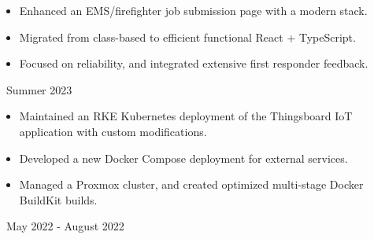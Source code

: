 \documentclass[11pt,letterpaper,ragged2e]{altacv}
\begin{document}

\hfuzz=5pt %

\begin{fullwidth}
	\makecvheader
\end{fullwidth}




{
	\begin{itemize}
		\item Enhanced an EMS/firefighter job submission page with a modern stack.
		\item Migrated from class-based to efficient functional React + TypeScript.
		\item Focused on reliability, and integrated extensive first responder feedback.
	\end{itemize}
}
{\faCalendar\, Summer 2023}
{
}


{
	\begin{itemize}
		\item Maintained an RKE Kubernetes deployment of the Thingsboard IoT application with custom modifications.
		\item Developed a new Docker Compose deployment for external services.
		\item Managed a Proxmox cluster, and created optimized multi-stage Docker BuildKit builds.
	\end{itemize}
}
{\faCalendar\, May 2022 - August 2022}
{
}
\end{document}
